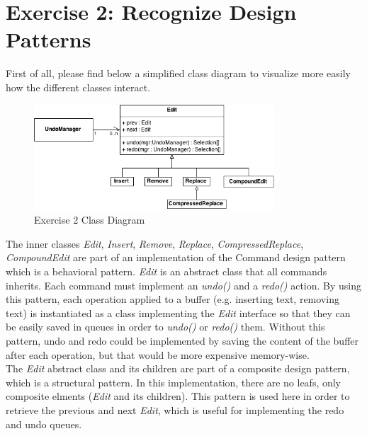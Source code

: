 \section{Exercise 2: Recognize Design Patterns}

First of all, please find below a simplified class diagram to visualize
more easily how the different classes interact.\\

\begin{figure}[h!]
    \includegraphics[width=0.8\textwidth]{images/ex2.png}
    \centering
    \caption{Exercise 2 Class Diagram}
\end{figure}

The inner classes \emph{Edit}, \emph{Insert}, \emph{Remove}, \emph{Replace},
\emph{CompressedReplace}, \emph{CompoundEdit} are part of an implementation of
the Command design pattern which is a behavioral pattern. \emph{Edit} is an
abstract class that all commands inherits. Each command must implement an
\emph{undo()} and a \emph{redo()} action. By using this pattern, each operation
applied to a buffer (e.g. inserting text, removing text) is instantiated
as a class implementing the \emph{Edit} interface so that they can be
easily saved in queues in order to \emph{undo()} or \emph{redo()} them.
Without this pattern, undo and redo could be implemented by saving the
content of the buffer after each operation, but that would be more
expensive memory-wise.\\

The \emph{Edit} abstract class and its children are part of a composite
design pattern, which is a structural pattern. In this implementation,
there are no leafs, only composite elments (\emph{Edit} and its
children). This pattern is used here in order to retrieve the previous
and next \emph{Edit}, which is useful for implementing the redo and undo
queues.
\newpage
